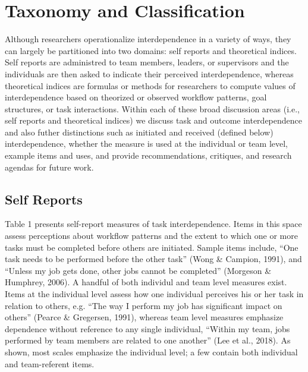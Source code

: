 \documentclass[english,,man]{apa6}
\theoremstyle{definition}
\theoremstyle{definition}
\theoremstyle{definition}
\theoremstyle{remark}
\begin{document}
\hypertarget{taxonomy-and-classification}{%
\section{Taxonomy and
Classification}\label{taxonomy-and-classification}}

Although researchers operationalize interdependence in a variety of
ways, they can largely be partitioned into two domains: self reports and
theoretical indices. Self reports are administred to team members,
leaders, or supervisors and the individuals are then asked to indicate
their perceived interdependence, whereas theoretical indices are
formulas or methods for researchers to compute values of interdependence
based on theorized or observed workflow patterns, goal structures, or
task interactions. Within each of these broad discussion areas (i.e.,
self reports and theoretical indices) we discuss task and outcome
interdependence and also futher distinctions such as initiated and
received (defined below) interdependence, whether the measure is used at
the individual or team level, example items and uses, and provide
recommendations, critiques, and research agendas for future work.

\hypertarget{self-reports}{%
\subsection{Self Reports}\label{self-reports}}

Table 1 presents self-report measures of task interdependence. Items in
this space assess perceptions about workflow patterns and the extent to
which one or more tasks must be completed before others are initiated.
Sample items include, \enquote{One task needs to be performed before the
other task} (Wong \& Campion, 1991), and \enquote{Unless my job gets
done, other jobs cannot be completed} (Morgeson \& Humphrey, 2006). A
handful of both individul and team level measures exist. Items at the
individual level assess how one individual perceives his or her task in
relation to others, e.g. \enquote{The way I perform my job has
significant impact on others} (Pearce \& Gregersen, 1991), whereas team
level measures emphasize dependence without reference to any single
individual, \enquote{Within my team, jobs performed by team members are
related to one another} (Lee et al., 2018). As shown, most scales
emphasize the individual level; a few contain both individual and
team-referent items.
\end{document}
